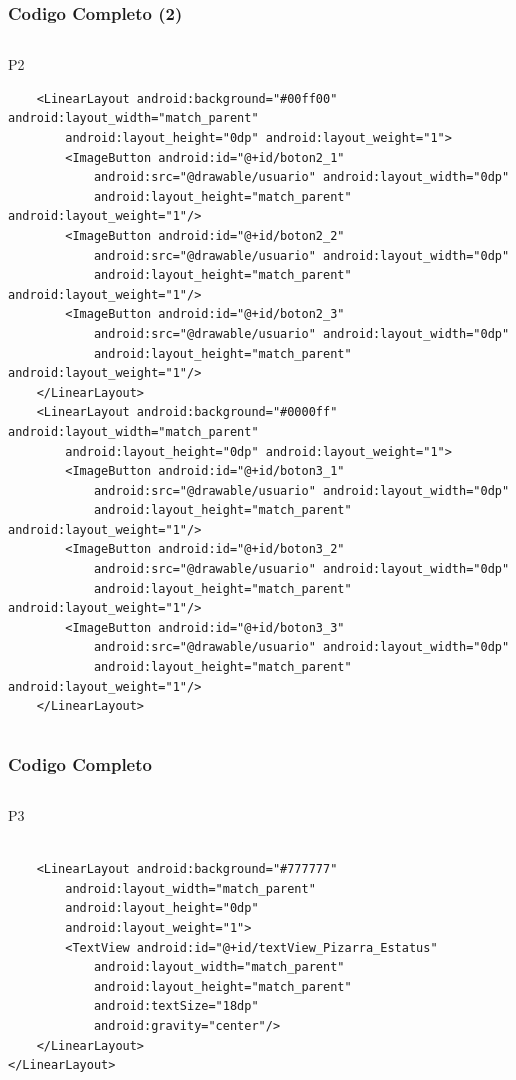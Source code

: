 \begin{frame}[fragile]
\frametitle{Codigo Completo (2)} 
\begin{columns}

\begin{block}{P2}
\begin{verbatim}
    <LinearLayout android:background="#00ff00" android:layout_width="match_parent"
        android:layout_height="0dp" android:layout_weight="1">
        <ImageButton android:id="@+id/boton2_1"
            android:src="@drawable/usuario" android:layout_width="0dp"
            android:layout_height="match_parent" android:layout_weight="1"/>
        <ImageButton android:id="@+id/boton2_2"
            android:src="@drawable/usuario" android:layout_width="0dp"
            android:layout_height="match_parent" android:layout_weight="1"/>
        <ImageButton android:id="@+id/boton2_3"
            android:src="@drawable/usuario" android:layout_width="0dp"
            android:layout_height="match_parent" android:layout_weight="1"/>
    </LinearLayout>
    <LinearLayout android:background="#0000ff" android:layout_width="match_parent"
        android:layout_height="0dp" android:layout_weight="1">
        <ImageButton android:id="@+id/boton3_1"
            android:src="@drawable/usuario" android:layout_width="0dp"
            android:layout_height="match_parent" android:layout_weight="1"/>
        <ImageButton android:id="@+id/boton3_2"
            android:src="@drawable/usuario" android:layout_width="0dp"
            android:layout_height="match_parent" android:layout_weight="1"/>
        <ImageButton android:id="@+id/boton3_3"
            android:src="@drawable/usuario" android:layout_width="0dp"
            android:layout_height="match_parent" android:layout_weight="1"/>
    </LinearLayout>
\end{verbatim}
\end{block}
\end{columns}
\end{frame}


\begin{frame}[fragile]
\frametitle{Codigo Completo} 
\begin{columns}
\begin{block}{P3}
\begin{verbatim}

    <LinearLayout android:background="#777777"
        android:layout_width="match_parent"
        android:layout_height="0dp"
        android:layout_weight="1">
        <TextView android:id="@+id/textView_Pizarra_Estatus"
            android:layout_width="match_parent"
            android:layout_height="match_parent"
            android:textSize="18dp"
            android:gravity="center"/>
    </LinearLayout>
</LinearLayout>
\end{verbatim}
\end{block}
\end{columns}
\end{frame}





